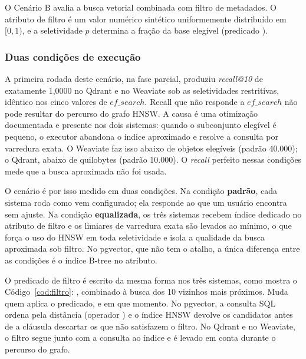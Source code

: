\label{sec:cenario_b}

O Cenário B avalia a busca vetorial combinada com filtro de metadados. O atributo de filtro é um valor numérico sintético uniformemente distribuído em $[0, 1)$, e a seletividade $p$ determina a fração da base elegível (predicado ).

\subsubsection{Duas condições de execução}
\label{sec:duas_condicoes}

A primeira rodada deste cenário, na fase parcial, produziu \textit{recall@10} de exatamente 1,0000 no Qdrant e no Weaviate sob as seletividades restritivas, idêntico nos cinco valores de $ef\_search$. Recall que não responde a $ef\_search$ não pode resultar do percurso do grafo HNSW. A causa é uma otimização documentada e presente nos dois sistemas: quando o subconjunto elegível é pequeno, o executor abandona o índice aproximado e resolve a consulta por varredura exata. O Weaviate faz isso abaixo de  objetos elegíveis (padrão 40.000); o Qdrant, abaixo de  quilobytes (padrão 10.000). O \textit{recall} perfeito nessas condições mede que a busca aproximada não foi usada.

O cenário é por isso medido em duas condições. Na condição \textbf{padrão}, cada sistema roda como vem configurado; ela responde ao que um usuário encontra sem ajuste. Na condição \textbf{equalizada}, os três sistemas recebem índice dedicado no atributo de filtro e os limiares de varredura exata são levados ao mínimo, o que força o uso do HNSW em toda seletividade e isola a qualidade da busca aproximada sob filtro. No pgvector, que não tem o atalho, a única diferença entre as condições é o índice B-tree no atributo.

O predicado de filtro é escrito da mesma forma nos três sistemas, como mostra o Código~\ref{cod:filtro}: , combinado à busca dos 10 vizinhos mais próximos. Muda quem aplica o predicado, e em que momento. No pgvector, a consulta SQL ordena pela distância (operador \code{<=>}) e o índice HNSW devolve os candidatos antes de a cláusula  descartar os que não satisfazem o filtro. No Qdrant e no Weaviate, o filtro segue junto com a consulta ao índice e é levado em conta durante o percurso do grafo.



